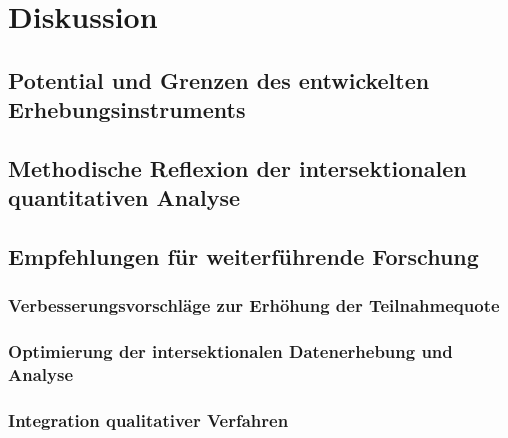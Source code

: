 
\chapter{Diskussion} \label{sec:diskussion}

\section{Potential und Grenzen des entwickelten Erhebungsinstruments}

\section{Methodische Reflexion der intersektionalen quantitativen Analyse}

\section{Empfehlungen für weiterführende Forschung}

\subsection{Verbesserungsvorschläge zur Erhöhung der Teilnahmequote}

\subsection{Optimierung der intersektionalen Datenerhebung und Analyse}

\subsection{Integration qualitativer Verfahren}
